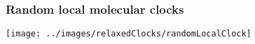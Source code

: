 \begin{frame}
\frametitle{Random local molecular clocks}

\texttt{[image: ../images/relaxedClocks/randomLocalClock]}

\end{frame}